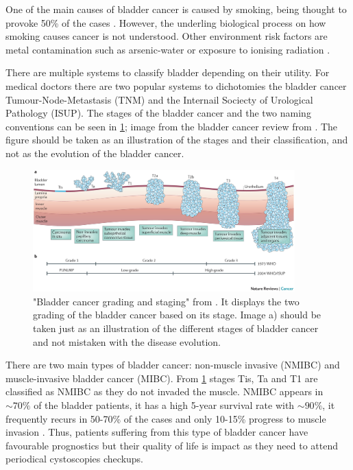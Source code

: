 One of the main causes of bladder cancer is caused by smoking, being thought to provoke 50\% of the cases \citet{Knowles2015-mu}. However, the underling biological process on how smoking causes cancer is not understood. Other environment risk factors are metal contamination such as arsenic-water or exposure to ionising radiation \citet{Knowles2015-mu}. 

There are multiple systems to classify bladder depending on their utility. For medical doctors there are two popular systems to dichotomies the bladder cancer Tumour-Node-Metastasis (TNM) and the Internail Sociecty of Urological Pathology (ISUP). The stages of the bladder cancer and the two naming conventions can be seen in \cref{fig:lit:bladder_cancer_stages}; image from the bladder cancer review from \citet{Knowles2015-mu}. The figure should be taken as an illustration of the stages and their classification, and not as the evolution of the bladder cancer.

\begin{figure}[!htb]    
    \centering
\includegraphics[width=0.9\textwidth,height=0.9\textheight,keepaspectratio]{Sections/Lit_review/Resources/bladder_cancer_grading.jpg}
    \caption{"Bladder cancer grading and staging" from \cite{Knowles2015-mu}. It displays the two grading of the bladder cancer based on its stage. Image a) should be taken just as an illustration of the different stages of bladder cancer and not mistaken with the disease evolution. }
    \label{fig:lit:bladder_cancer_stages}
\end{figure}


There are two main types of bladder cancer: non-muscle invasive (NMIBC) and muscle-invasive bladder cancer (MIBC). From \cref{fig:lit:bladder_cancer_stages} stages Tis, Ta and T1 are classified as NMIBC as they do not invaded the muscle. NMIBC appears in $\sim70\%$ of the bladder patients, it has a high 5-year survival rate with $\sim90\%$, it frequently recurs in 50-70\% of the cases and only 10-15\% progress to muscle invasion \cite{Knowles2015-mu}. Thus, patients suffering from this type of bladder cancer have favourable prognostics but their quality of life is impact as they need to attend periodical cystoscopies checkups.

